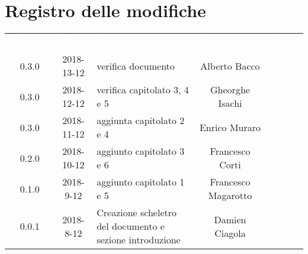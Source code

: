
\section*{Registro delle modifiche}
{
	\renewcommand{\arraystretch}{1.5}
	\centering
	\begin{longtable}{ c c  C{4cm}  c  c }
		\textcolor{white}{\textbf{Versione}} & \textcolor{white}{\textbf{Data}} & \textcolor{white}{\textbf{Descrizione}} & \textcolor{white}{\textbf{Nominativo}} & \textcolor{white}{\textbf{Ruolo}}\\
		0.3.0 & 2018-13-12 & verifica documento & Alberto Bacco & \ver{} \\
		0.3.0 & 2018-12-12 & verifica capitolato 3, 4 e 5 & Gheorghe Isachi & \ver{}\\
		0.3.0 & 2018-11-12 &  aggiunta capitolato 2 e 4 & Enrico Muraro & \ana{}\\
		0.2.0 & 2018-10-12 & aggiunto capitolato 3 e 6 & Francesco Corti & \ana{}\\
		0.1.0 & 2018-9-12 & aggiunto capitolato 1 e 5 & Francesco Magarotto & \ana{} \\
		0.0.1 & 2018-8-12 & Creazione scheletro del documento e sezione introduzione & Damien Ciagola & \ana{}\\
	\end{longtable}

}